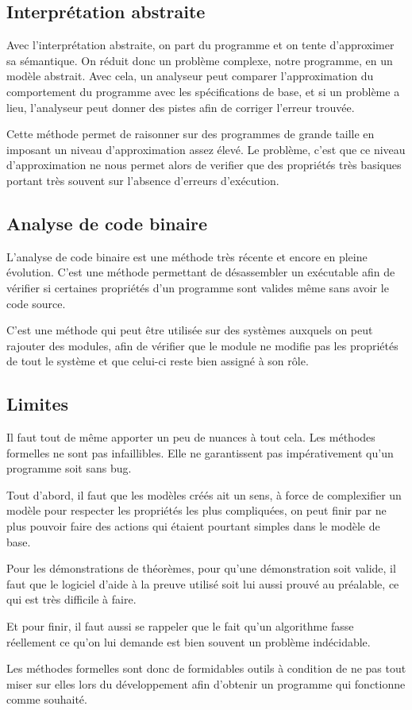 \documentclass[12pt]{report}
\begin{document}
\subsection{Interprétation abstraite}
Avec l'interprétation abstraite, on part du programme et on tente d'approximer sa sémantique. On réduit donc un problème complexe, notre programme, en un modèle abstrait. Avec cela, un analyseur peut comparer l'approximation du comportement du programme avec les spécifications de base, et si un problème a lieu, l'analyseur peut donner des pistes afin de corriger l'erreur trouvée.

Cette méthode permet de raisonner sur des programmes de grande taille en imposant un niveau d'approximation assez élevé. Le problème, c'est que ce niveau d'approximation ne nous permet alors de verifier que des propriétés très basiques portant très souvent sur l'absence d'erreurs d'exécution\cite{cousot}.    
\subsection{Analyse de code binaire}

L'analyse de code binaire est une méthode très récente et encore en pleine évolution. C'est une méthode permettant de désassembler un exécutable afin de vérifier si certaines propriétés d'un programme sont valides même sans avoir le code source. 

C'est une méthode qui peut être utilisée sur des systèmes auxquels on peut rajouter des modules, afin de vérifier que le module ne modifie pas les propriétés de tout le système et que celui-ci reste bien assigné à son rôle\cite{griffault}.
\subsection{Limites}

Il faut tout de même apporter un peu de nuances à tout cela. Les méthodes formelles ne sont pas infaillibles. Elle ne garantissent pas impérativement qu'un programme soit sans bug.

Tout d'abord, il faut que les modèles créés ait un sens, à force de complexifier un modèle pour respecter les propriétés les plus compliquées, on peut finir par ne plus pouvoir faire des actions qui étaient pourtant simples dans le modèle de base. 

Pour les démonstrations de théorèmes, pour qu'une démonstration soit valide, il faut que le logiciel d'aide à la preuve utilisé soit lui aussi prouvé au préalable, ce qui est très difficile à faire.

Et pour finir, il faut aussi se rappeler que le fait qu'un algorithme fasse réellement ce qu'on lui demande est bien souvent un problème indécidable\cite{griffault}.

Les méthodes formelles sont donc de formidables outils à condition de ne pas tout miser sur elles lors du développement afin d'obtenir un programme qui fonctionne comme souhaité.

\printglossaries
\printbibliography
\end{document}
